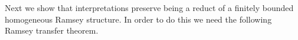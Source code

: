 \documentclass{amsart}
\theoremstyle{definition}
\newtheorem{lemma}[theorem]{Lemma}
\newtheorem{proposition}[theorem]{Proposition}
\theoremstyle{remark}
\numberwithin{equation}{section}
\newcommand{\fa}{\mathfrak{A}}
\newcommand{\fb}{\mathfrak{B}}
\newcommand{\fc}{\mathfrak{C}}
\begin{document}

	Next we show that interpretations preserve being a reduct of a finitely bounded homogeneous Ramsey structure. In order to do this we need the following Ramsey transfer theorem.
	
\end{document}
